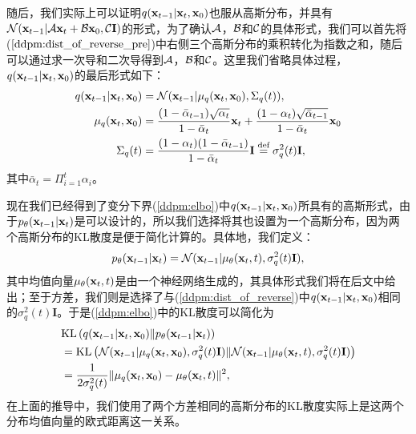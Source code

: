 \documentclass[11pt,a4paper,UTF8]{ctexart}
\begin{document}
随后，我们实际上可以证明$q(\mathbf{x}_{t-1}|\mathbf{x}_t,\mathbf{x}_0)$也服从高斯分布，并具有$\mathcal{N}(\mathbf{x}_{t-1}|\mathcal{A}\mathbf{x}_t+\mathcal{B}\mathbf{x}_0,\mathcal{C}\mathbf{I})$的形式，为了确认$\mathcal{A}$，$\mathcal{B}$和$\mathcal{C}$的具体形式，我们可以首先将($\ref{ddpm:dist_of_reverse_pre}$)中右侧三个高斯分布的乘积转化为指数之和，随后可以通过求一次导和二次导得到$\mathcal{A}$，$\mathcal{B}$和$\mathcal{C}$。这里我们省略具体过程，$q(\mathbf{x}_{t-1}|\mathbf{x}_t,\mathbf{x}_0)$的最后形式如下：
\begin{align}
\begin{split}
    q(\mathbf{x}_{t-1}|\mathbf{x}_t,\mathbf{x}_0) &= \mathcal{N}(\mathbf{x}_{t-1}|\mu_q(\mathbf{x}_t,\mathbf{x}_0),\Sigma_q(t)),\\
    \mu_q(\mathbf{x}_t,\mathbf{x}_0) &= \frac{(1-\bar{\alpha}_{t-1})\sqrt{\alpha_t}}{1-\bar{\alpha}_t}\mathbf{x}_t + \frac{(1-\alpha_t)\sqrt{\bar{\alpha}_{t-1}}}{1-\bar{\alpha}_t}\mathbf{x}_0 \\
    \Sigma_q(t) &= \frac{(1-\alpha_t)(1-\bar{\alpha}_{t-1})}{1-\bar{\alpha}_t}\mathbf{I}  \stackrel{\text{def}}{=} \sigma_q^2(t)\mathbf{I},
\end{split}
\label{ddpm:dist_of_reverse}
\end{align}
其中$\bar{\alpha}_t=\Pi_{i=1}^t \alpha_i$。

现在我们已经得到了变分下界(\ref{ddpm:elbo})中$q(\mathbf{x}_{t-1}|\mathbf{x}_t,\mathbf{x}_0)$所具有的高斯形式，由于$p_{\theta}(\mathbf{x}_{t-1}|\mathbf{x}_t)$是可以设计的，所以我们选择将其也设置为一个高斯分布，因为两个高斯分布的KL散度是便于简化计算的。具体地，我们定义：
\begin{equation}
p_{\theta}(\mathbf{x}_{t-1}|\mathbf{x}_t) = \mathcal{N}(\mathbf{x}_{t-1}| \mu_{\theta}(\mathbf{x}_t,t), \sigma_q^2(t)\mathbf{I}),
\label{ddpm:p_reverse}
\end{equation}
其中均值向量$\mu_{\theta}(\mathbf{x}_t,t)$是由一个神经网络生成的，其具体形式我们将在后文中给出；至于方差，我们则是选择了与(\ref{ddpm:dist_of_reverse})中$q(\mathbf{x}_{t-1}|\mathbf{x}_t,\mathbf{x}_0)$相同的$\sigma_q^2(t)\mathbf{I}$。于是(\ref{ddpm:elbo})中的KL散度可以简化为
\begin{align}
\begin{split}
    & \text{KL}\left(q(\mathbf{x}_{t-1}|\mathbf{x}_t,\mathbf{x}_0) \| p_{\theta}(\mathbf{x}_{t-1}|\mathbf{x}_t)\right) \\
    &= \text{KL} \left(\mathcal{N}(\mathbf{x}_{t-1}|\mu_q(\mathbf{x}_t,\mathbf{x}_0),\sigma_q^2(t)\mathbf{I}) \| \mathcal{N}(\mathbf{x}_{t-1}| \mu_{\theta}(\mathbf{x}_t,t), \sigma_q^2(t)\mathbf{I})\right) \\
    &= \frac{1}{2\sigma_q^2(t)} \| \mu_q(\mathbf{x}_t,\mathbf{x}_0) - \mu_{\theta}(\mathbf{x}_t,t) \|^2,
\label{ddpm:elbo_simp_1}
\end{split}
\end{align}
在上面的推导中，我们使用了两个方差相同的高斯分布的KL散度实际上是这两个分布均值向量的欧式距离这一关系。
\end{document}
